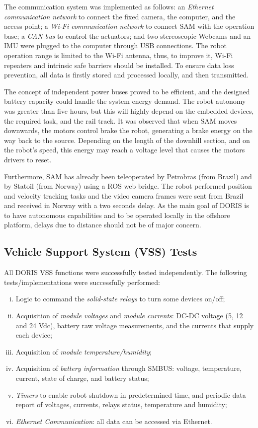 \documentclass{ifacconf}
\begin{document}
The communication system was implemented as follows: an \emph{Ethernet
communication network} to connect the fixed camera, the computer, and the access
point; a \emph{Wi-Fi communication network} to connect SAM with the operation
base; a \emph{CAN bus} to control the actuators; and two stereoscopic Webcams
and an IMU were plugged to the computer through USB connections. The robot
operation range is limited to the Wi-Fi antenna, thus, to improve it, Wi-Fi
repeaters and intrinsic safe barriers should be installed. To ensure data loss
prevention, all data is firstly stored and processed locally, and then
transmitted.

The concept of independent power buses proved to be efficient, and the designed
battery capacity could handle the system energy demand. The robot autonomy was
greater than five hours, but this will highly depend on the embedded devices,
the required task, and the rail track. It was observed that when SAM moves
downwards, the motors control brake the robot, generating a brake energy on the
way back to the source. Depending on the length of the downhill section, and on
the robot's speed, this energy may reach a voltage level that causes the motors
drivers to reset. 

Furthermore, SAM has already been teleoperated by Petrobras (from Brazil) and by
Statoil (from Norway) using a ROS web bridge. The robot performed position and
velocity tracking tasks and the video camera frames were sent from Brazil and received in Norway with a two seconds
delay. As the main goal of DORIS is to have autonomous capabilities and to be
operated locally in the offshore platform, delays due to distance should not be
of major concern.

\subsection{Vehicle Support System (VSS) Tests}\label{sec:VSS_tests}
All DORIS VSS functions were successfully tested independently. The following tests/implementations were successfully performed:
\begin{enumerate}[i)]
    \item Logic to command the \emph{solid-state relays} to turn some devices
    on/off;
    \item Acquisition of \emph{module voltages} and \emph{module currents}:
    DC-DC voltage (5, 12 and 24 Vdc), battery raw voltage measurements, and the
    currents that supply each device;
    \item Acquisition of \emph{module temperature/humidity};
    \item Acquisition of \emph{battery information} through SMBUS: voltage,
    temperature, current, state of charge, and battery status;
    \item \emph{Timers} to enable robot shutdown in predetermined time, and
    periodic data report of voltages, currents, relays status, temperature and
    humidity;
    \item \emph{Ethernet Communication}: all data can be accessed via Ethernet.
\end{enumerate}
\end{document}
